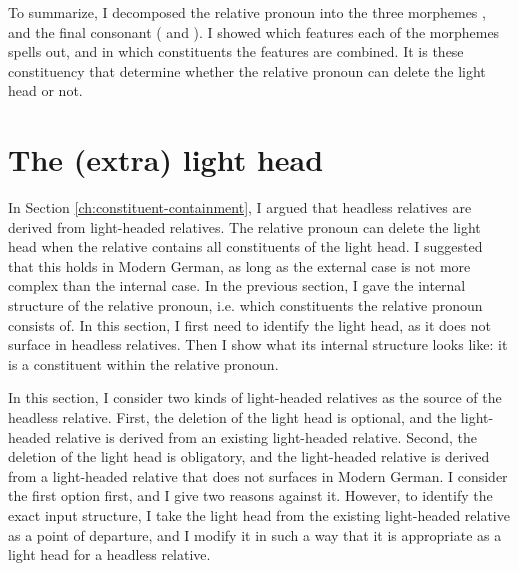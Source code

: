 To summarize, I decomposed the relative pronoun into the three morphemes ,  and the final consonant ( and ). I showed which features each of the morphemes spells out, and in which constituents the features are combined. It is these constituency that determine whether the relative pronoun can delete the light head or not.

\section{The (extra) light head}\label{sec:light-mg}

In Section \ref{ch:constituent-containment}, I argued that headless relatives are derived from light-headed relatives. The relative pronoun can delete the light head when the relative contains all constituents of the light head. I suggested that this holds in Modern German, as long as the external case is not more complex than the internal case. In the previous section, I gave the internal structure of the relative pronoun, i.e. which constituents the relative pronoun consists of. In this section, I first need to identify the light head, as it does not surface in headless relatives. Then I show what its internal structure looks like: it is a constituent within the relative pronoun.

In this section, I consider two kinds of light-headed relatives as the source of the headless relative.
First, the deletion of the light head is optional, and the light-headed relative is derived from an existing light-headed relative.
Second, the deletion of the light head is obligatory, and the light-headed relative is derived from a light-headed relative that does not surfaces in Modern German.
I consider the first option first, and I give two reasons against it.
However, to identify the exact input structure, I take the light head from the existing light-headed relative as a point of departure, and I modify it in such a way that it is appropriate as a light head for a headless relative.

